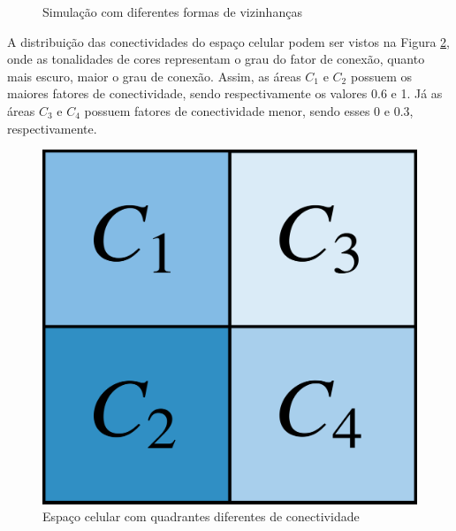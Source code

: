 \documentclass[a4paper,12pt]{article}
\begin{document}
\begin{figure}[!ht]
\centering
{}
\qquad
{}
\caption{Simulação com diferentes formas de vizinhanças}
\label{figure:exp1graph}
\end{figure}

A distribuição das conectividades do espaço celular podem ser vistos na Figura \ref{figure:artificialCellSpace}, onde as tonalidades de cores representam o grau do fator de conexão, quanto mais escuro, maior o grau de conexão. Assim, as áreas $C_1$ e $C_2$ possuem os maiores fatores de conectividade, sendo respectivamente os valores 0.6 e 1. Já as áreas $C_3$ e $C_4$ possuem fatores de conectividade menor, sendo esses 0 e 0.3, respectivamente. 

\begin{figure}[!ht]
 \begin{center}
  \includegraphics[width=0.35\linewidth]{fig/area_artificial.png}
 \end{center}
 \caption{Espaço celular com quadrantes diferentes de conectividade}
\label{figure:artificialCellSpace}
\end{figure}
\end{document}
